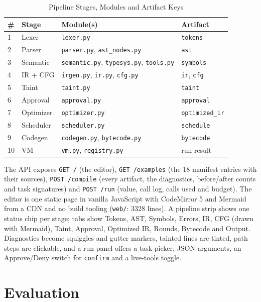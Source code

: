 \documentclass[conference]{IEEEtran}
\begin{document}
\begin{table}[!htb]
\caption{Pipeline Stages, Modules and Artifact Keys}
\label{tab:modules}
\centering
\footnotesize
\setlength{\tabcolsep}{3pt}
\renewcommand{\arraystretch}{1.1}
\begin{tabular}{P{0.165in}P{0.965in}P{1.165in}P{0.865in}}
\hline
\textbf{\#} & \textbf{Stage} & \textbf{Module(s)} & \textbf{Artifact} \\
 & Lexer & \texttt{lexer.py} & \texttt{tokens} \\
2 & Parser & \texttt{parser.py}, \texttt{ast\_nodes.py} & \texttt{ast} \\
3 & Semantic & \texttt{semantic.py}, \texttt{typesys.py}, \texttt{tools.py} & \texttt{symbols} \\
4 & IR + CFG & \texttt{irgen.py}, \texttt{ir.py}, \texttt{cfg.py} & \texttt{ir}, \texttt{cfg} \\
5 & Taint & \texttt{taint.py} & \texttt{taint} \\
6 & Approval & \texttt{approval.py} & \texttt{approval} \\
7 & Optimizer & \texttt{optimizer.py} & \texttt{optimized\_ir} \\
8 & Scheduler & \texttt{scheduler.py} & \texttt{schedule} \\
9 & Codegen & \texttt{codegen.py}, \texttt{bytecode.py} & \texttt{bytecode} \\
10 & VM & \texttt{vm.py}, \texttt{registry.py} & run result \\
\hline
\end{tabular}
\end{table}
The API exposes \texttt{GET /\allowbreak{}} (the editor), \texttt{GET /\allowbreak{}examples} (the 18 manifest entries with their sources), \texttt{POST /\allowbreak{}compile} (every artifact, the diagnostics, before/after counts and task signatures) and \texttt{POST /\allowbreak{}run} (value, call log, calls used and budget). The editor is one static page in vanilla JavaScript with CodeMirror 5 and Mermaid from a CDN and no build tooling (\texttt{web/\allowbreak{}}: 3328 lines). A pipeline strip shows one status chip per stage; tabs show Tokens, AST, Symbols, Errors, IR, CFG (drawn with Mermaid), Taint, Approval, Optimized IR, Rounds, Bytecode and Output. Diagnostics become squiggles and gutter markers, tainted lines are tinted, path steps are clickable, and a run panel offers a task picker, JSON arguments, an Approve/Deny switch for \texttt{confirm} and a live-tools toggle.

\section{Evaluation}
\end{document}
